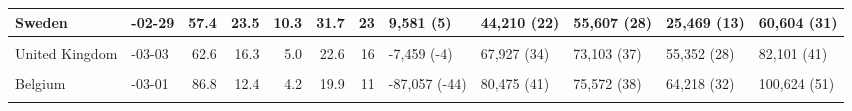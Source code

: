 \documentclass[
]{article}
\begin{document}
\begin{landscape}
\begin{table}[H]
{\begin{tabular}[t]{l|>{\raggedright\arraybackslash}p{5em}|r|r|r|r|r|l|l|l|l|l}
\hline
Sweden & 2020-02-29 & 57.4 & 23.5 & 10.3 & 31.7 & 23 & 9,581 (5) & 44,210 (22) & 55,607 (28) & 25,469 (13) & 60,604 (31)\\
\hline
\cellcolor{gray!6}{Italy} & \cellcolor{gray!6}{2020-02-23} & \cellcolor{gray!6}{59.1} & \cellcolor{gray!6}{9.1} & \cellcolor{gray!6}{3.1} & \cellcolor{gray!6}{18.3} & \cellcolor{gray!6}{17} & \cellcolor{gray!6}{4,136 (2)} & \cellcolor{gray!6}{91,604 (46)} & \cellcolor{gray!6}{79,120 (40)} & \cellcolor{gray!6}{69,577 (35)} & \cellcolor{gray!6}{80,417 (40)}\\
\hline
United Kingdom & 2020-03-03 & 62.6 & 16.3 & 5.0 & 22.6 & 16 & -7,459 (-4) & 67,927 (34) & 73,103 (37) & 55,352 (28) & 82,101 (41)\\
\hline
\cellcolor{gray!6}{Spain} & \cellcolor{gray!6}{2020-02-29} & \cellcolor{gray!6}{65.0} & \cellcolor{gray!6}{8.6} & \cellcolor{gray!6}{4.6} & \cellcolor{gray!6}{14.2} & \cellcolor{gray!6}{9} & \cellcolor{gray!6}{-15,204 (-8)} & \cellcolor{gray!6}{93,247 (47)} & \cellcolor{gray!6}{74,163 (37)} & \cellcolor{gray!6}{82,872 (42)} & \cellcolor{gray!6}{105,829 (53)}\\
\hline
Belgium & 2020-03-01 & 86.8 & 12.4 & 4.2 & 19.9 & 11 & -87,057 (-44) & 80,475 (41) & 75,572 (38) & 64,218 (32) & 100,624 (51)\\
\hline
\cellcolor{gray!6}{United States of America} & \cellcolor{gray!6}{2020-03-07} & \cellcolor{gray!6}{60.3} & \cellcolor{gray!6}{36.9} & \cellcolor{gray!6}{27.2} & \cellcolor{gray!6}{39.4} & \cellcolor{gray!6}{41} & \cellcolor{gray!6}{0 (0)} & \cellcolor{gray!6}{0 (0)} & \cellcolor{gray!6}{0 (0)} & \cellcolor{gray!6}{0 (0)} & \cellcolor{gray!6}{0 (0)}\\
\hline
\end{tabular}}
\end{table}
\end{landscape}
\end{document}
